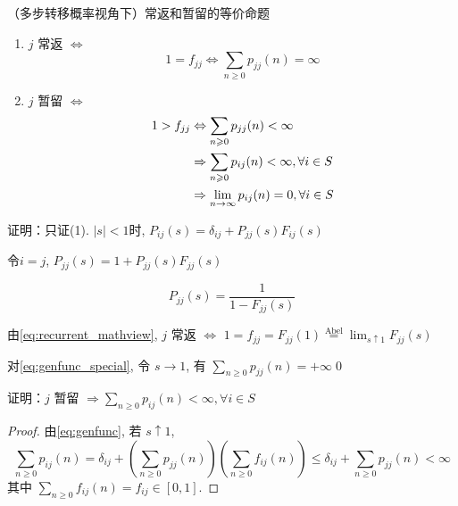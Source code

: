 \begin{proposition}\label{prop:states_equiv}
（多步转移概率视角下）常返和暂留的等价命题
\begin{enumerate}
\item $j$ 常返 $\iff$
\begin{equation}
1=f_{jj}\Leftrightarrow \sum_{n\geq 0}p_{jj}(n)=\infty
\label{eq:recurrent_multistep}
\end{equation}
\item $j$ 暂留 $\iff$
\begin{equation}
\begin{aligned}
1>f_{jj}&\Leftrightarrow \sum_{n\geqslant 0}p_{jj}(n)<\infty\\
&\Rightarrow \sum_{n\geqslant 0}p_{ij}(n)<\infty, \forall i\in S\\
&\Rightarrow \lim_{n \to \infty}p_{ij}(n)=0,\forall i\in S
\end{aligned}
\label{eq:transient_multistep}
\end{equation}
\end{enumerate}
\end{proposition}

证明：只证(1). $|s|<1$时, $P_{ij}(s)=\delta_{ij}+P_{jj}(s)F_{ij}(s)$

令$i=j$, $P_{jj}(s)=1+P_{jj}(s)F_{jj}(s)$

\begin{equation}
P_{jj}(s)=\frac{1}{1-F_{jj}(s)}
\label{eq:genfunc_special}
\end{equation}

由\eqref{eq:recurrent_mathview}, $j$ 常返 $\iff$ $1=f_{jj}=F_{jj}(1)\overset{\text{Abel}}{=}\lim_{s\uparrow 1}F_{jj}(s)$

对\eqref{eq:genfunc_special}, 令 $s\to 1$, 有 $\sum_{n\geq 0}p_{jj}(n)=+\infty$\qed

\begin{problem}[作业5-1]
证明：$j$ 暂留 $\Rightarrow \sum_{n\geq 0}p_{ij}(n)<\infty, \forall i\in S$
\end{problem}
\begin{proof}
由\eqref{eq:genfunc}, 若 $s\uparrow 1$, 
\[
\sum_{n\geq 0}p_{ij}(n)=\delta_{ij}+\left(\sum_{n\geq 0}p_{jj}(n)\right)\left(\sum_{n\geq 0}f_{ij}(n)\right)\leq \delta_{ij}+\sum_{n\geq 0}p_{jj}(n)<\infty
\]
其中 $\sum_{n\geq 0}f_{ij}(n)=f_{ij}\in [0,1]$.
\end{proof}

